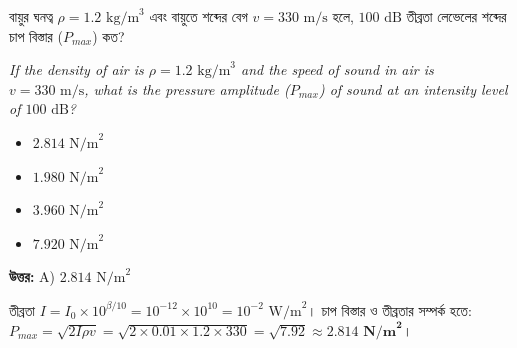 \documentclass[12pt, a4paper]{article}
\begin{document}
\vspace{2em}

\begin{tcolorbox}[questionbox={প্রশ্ন (Question) 11}]
    \noindent
    বায়ুর ঘনত্ব $\rho = 1.2\text{ kg/m}^3$ এবং বায়ুতে শব্দের বেগ $v = 330\text{ m/s}$ হলে, $100\text{ dB}$ তীব্রতা লেভেলের শব্দের চাপ বিস্তার ($P_{max}$) কত?
    
    \vspace{0.8em}
    \begin{english}
    \noindent\textit{\color{darkgray}
    If the density of air is $\rho = 1.2\text{ kg/m}^3$ and the speed of sound in air is $v = 330\text{ m/s}$, what is the pressure amplitude ($P_{max}$) of sound at an intensity level of $100\text{ dB}$?
    }
    \end{english}
\end{tcolorbox}

\begin{itemize}[label={}, leftmargin=1cm, itemsep=0.5em]
    \item[\textbf{A)}] $2.814\text{ N/m}^2$
    \item[\textbf{B)}] $1.980\text{ N/m}^2$
    \item[\textbf{C)}] $3.960\text{ N/m}^2$
    \item[\textbf{D)}] $7.920\text{ N/m}^2$
\end{itemize}

\vspace{0.5em}
\begin{tcolorbox}[answerbox]
    \textbf{\color{success} উত্তর:} A) $2.814\text{ N/m}^2$
\end{tcolorbox}
\vspace{1em}

\begin{tcolorbox}[solutionbox={সমাধান (Solution)}]
    \noindent
    তীব্রতা $I = I_0 \times 10^{\beta/10} = 10^{-12} \times 10^{10} = 10^{-2}\text{ W/m}^2$। চাপ বিস্তার ও তীব্রতার সম্পর্ক হতে: $P_{max} = \sqrt{2 I \rho v} = \sqrt{2 \times 0.01 \times 1.2 \times 330} = \sqrt{7.92} \approx \mathbf{2.814\text{ N/m}^2}$।
\end{tcolorbox}

\vspace{2em}
\end{document}
